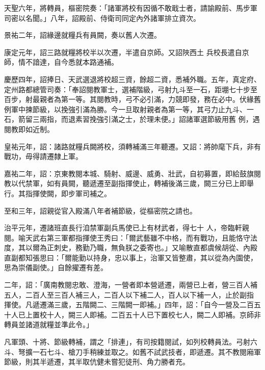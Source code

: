 \begin{pinyinscope}
 天聖六年，將轉員，樞密院奏：「諸軍將校有因循不敢戢士者，請諭殿前、馬步軍司密以名聞。」八年，詔殿前、侍衛司同定內外諸軍排立資次。



 景祐二年，詔緣邊就糧兵有員闕，奏以舊人次遷。



 康定元年，詔三路就糧將校半以次遷，半遣自京師。又詔陜西土
 兵校長遣自京師，情不諳達，自今悉就本路通補。



 慶歷四年，詔捧日、天武選退將校超三資，餘超二資，悉補外職。五年，真定府、定州路都總管司奏：「奉詔閱教軍士，選補階級，弓射九斗至一石，距堋七十步至百步，射最親者為第一等。其閱教時，弓不必引滿，力競即發，務在必中。伏緣舊例軍中揀節級，以挽強引滿為勝。今一旦取射親者為第一等，其弓力止九斗、一石，箭留三兩指，而退素習挽強引滿之士，於理未便。」詔諸軍選節級用舊
 例，遇閱教即如近制。



 皇祐元年，詔：諸路就糧兵闕將校，須轉補滿三年聽遷。又詔：將帥麾下兵，非有戰功，毋得請遷隸上軍。



 嘉祐二年，詔：京東教閱本城、騎射、威邊、威勇、壯武，自初募置，即給鼓旗閱教以代禁軍，如有員闕，聽遞遷至副指揮使止，轉補後滿三歲，闕三分已上即舉行。其指揮使闕，即步軍司補之。



 至和三年，詔親從官入殿滿八年者補節級，從樞密院之請也。



 治平元年，遷諸班直長行洎禁軍副兵馬使已上有材武者，得七十
 人，帝臨軒親閱。喻天武右第三軍都指揮使王秀曰：「爾武藝雖不中格，而有戰功，且能恪守法度，其以爾為正刺史，務勤乃職，無負朕之委寄也。」又喻散直都虞候胡從、內殿直副都知張思曰：「爾能勤以持身，忠以事上，治軍又皆整肅，其以從為內園使，思為崇儀副使。」自餘擢遷有差。



 二年，詔：「廣南教閱忠敢、澄海，一營者即本營遞遷，兩營已上者，營三百人補五人，二百人至三百人補三人，二百人以下補二人，百人以下補一人，止於副指
 揮使。凡遞遷滿三歲，五階闕二、三階闕一即補。」四年，詔：「自今一營及二百五十人已上置校十人，闕三人即補。二百五十人已下置校七人，闕二人即補。京師非轉員並諸道就糧並準此令。」



 凡軍頭、十將、節級轉補，謂之「排連」，有司按籍閱試，如列校轉員法。弓射六斗、弩擴一石七斗、槍刀手稍練並取之。如舊不試武技者，即遞遷。其不教閱廂軍節級，則其半遞遷，其半取伉健未嘗犯徒刑、角力勝者充。




\end{pinyinscope}
